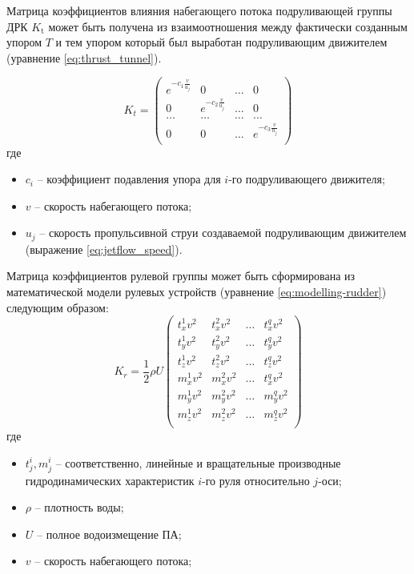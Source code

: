 Матрица коэффициентов влияния набегающего потока подруливающей группы ДРК $K_{\text{t}}$ может быть получена из взаимоотношения между фактически созданным упором $T$ и тем упором который был выработан подруливающим движителем (уравнение \ref{eq:thrust_tunnel}).

\begin{equation}
    \label{eq:flow_matrix}
    K_t = 
    \begin{pmatrix}
        e^{-c_1\frac{v}{u_j}} & 0 & \ldots & 0 \\
        0 & e^{-c_2\frac{v}{u_j}} & \ldots & 0 \\
        \ldots & \ldots & \ldots & \ldots \\
        0 & 0 & \ldots & e^{-c_3\frac{v}{u_j}} \\
    \end{pmatrix}
\end{equation}
\noindent где
\begin{itemize}
    \item $c_i$ -- коэффициент подавления упора для $i$-го подруливающего движителя;
    \item $v$ -- скорость набегающего потока;
    \item $u_j$ -- скорость пропульсивной струи создаваемой подруливающим движителем (выражение \ref{eq:jetflow_speed}).
\end{itemize}

Матрица коэффициентов рулевой группы может быть сформирована из математической модели рулевых устройств (уравнение \ref{eq:modelling-rudder}) следующим образом:
\begin{equation*}
    K_r = 
    \frac{1}{2}\rho U
    \begin{pmatrix}
        t_x^{1} v^2 & t_x^{2} v^2 & \ldots & t_x^{q} v^2 \\
        t_y^{1} v^2 & t_y^{2} v^2 & \ldots & t_y^{q} v^2 \\
        t_z^{1} v^2 & t_z^{2} v^2 & \ldots & t_z^{q} v^2 \\
        m_x^{1} v^2 & m_x^{2} v^2 & \ldots & t_x^{q} v^2 \\
        m_y^{1} v^2 & m_y^{2} v^2 & \ldots & m_y^{q} v^2 \\
        m_z^{1} v^2 & m_z^{2} v^2 & \ldots & m_z^{q} v^2 \\
    \end{pmatrix}
\end{equation*}
\noindent где
\begin{itemize}
    \item $t_j^{i}, m_j^{i}$ -- соответственно, линейные и вращательные производные гидродинамических характеристик $i$-го руля относительно $j$-оси;
    \item $\rho$ -- плотность воды;
    \item $U$ -- полное водоизмещение ПА;
    \item $v$ -- скорость набегающего потока;
\end{itemize}


